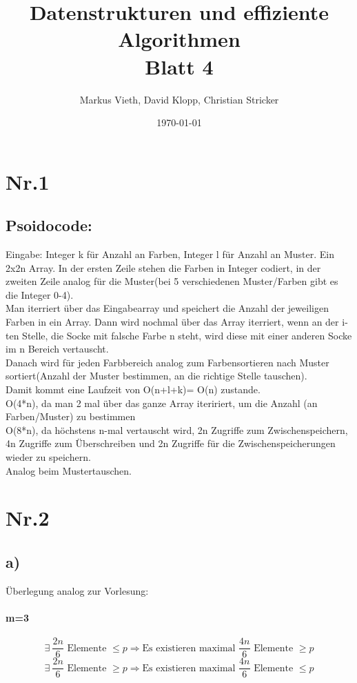\documentclass[a4paper,11pt,twoside]{article}
\title{Datenstrukturen und effiziente Algorithmen\\ Blatt 4}
\author{Markus Vieth, David Klopp, Christian Stricker}
\date{\today}
\begin{document}
\maketitle
\cleardoublepage
\pagestyle{myheadings}

\section*{Nr.1}
\subsection*{Psoidocode:}
Eingabe: Integer k für Anzahl an Farben, Integer l für Anzahl an Muster. Ein 2x2n Array. In der ersten Zeile stehen die Farben in Integer codiert, in der zweiten Zeile analog für die Muster(bei 5 verschiedenen Muster/Farben gibt es die Integer 0-4).\\
Man iterriert über das Eingabearray und speichert die Anzahl der jeweiligen Farben in ein Array. Dann wird nochmal über das Array iterriert, wenn an der i-ten Stelle, die Socke mit falsche Farbe n steht, wird diese mit einer anderen Socke im n Bereich vertauscht.\\
Danach wird für jeden Farbbereich analog zum Farbensortieren nach Muster sortiert(Anzahl der Muster bestimmen, an die richtige Stelle tauschen).\\
Damit kommt eine Laufzeit von O(n+l+k)= O(n) zustande.\\
O(4*n), da man 2 mal über das ganze Array iteririert, um die Anzahl (an Farben/Muster) zu bestimmen\\
O(8*n), da höchstens n-mal vertauscht wird, 2n Zugriffe zum Zwischenspeichern, 4n Zugriffe zum Überschreiben und 2n Zugriffe für die Zwischenspeicherungen wieder zu speichern.\\
Analog beim Mustertauschen.\\

\section*{Nr.2}
\subsection*{a)}
Überlegung analog zur Vorlesung:\\
\paragraph*{m=3}
\[\exists~\frac{2n}{6}\text{ Elemente }\leq p\Rightarrow \text{Es existieren maximal }\frac{4n}{6}\text{ Elemente }\geq p\]
\[\exists~\frac{2n}{6}\text{ Elemente }\geq p\Rightarrow \text{Es existieren maximal }\frac{4n}{6}\text{ Elemente }\leq p\]
\end{document}
